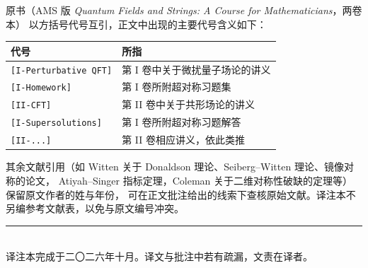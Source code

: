 \documentclass[11pt,a4paper]{article}
\theoremstyle{remark}
\theoremstyle{definition}
\theoremstyle{plain}
\begin{document}
原书（AMS 版 \emph{Quantum Fields and Strings: A Course for Mathematicians}，两卷本）
以方括号代号互引，正文中出现的主要代号含义如下：

\begin{center}
\begin{tabular}{@{}ll@{}}
\toprule
代号 & 所指 \\
\midrule
\texttt{[I-Perturbative QFT]} & 第 I 卷中关于微扰量子场论的讲义 \\
\texttt{[I-Homework]} & 第 I 卷所附超对称习题集 \\
\texttt{[II-CFT]} & 第 II 卷中关于共形场论的讲义 \\
\texttt{[I-Supersolutions]} & 第 I 卷所附超对称习题解答 \\
\texttt{[II-...]} & 第 II 卷相应讲义，依此类推 \\
\bottomrule
\end{tabular}
\end{center}

其余文献引用（如 Witten 关于 Donaldson 理论、Seiberg--Witten 理论、镜像对称的论文，
Atiyah--Singer 指标定理，Coleman 关于二维对称性破缺的定理等）保留原文作者的姓与年份，
可在正文批注给出的线索下查核原始文献。译注本不另编参考文献表，以免与原文编号冲突。

\vspace{1.5em}
\noindent\rule{0.4\linewidth}{0.4pt}\\[0.4em]
{\small 译注本完成于二〇二六年十月。译文与批注中若有疏漏，文责在译者。}
\end{document}
